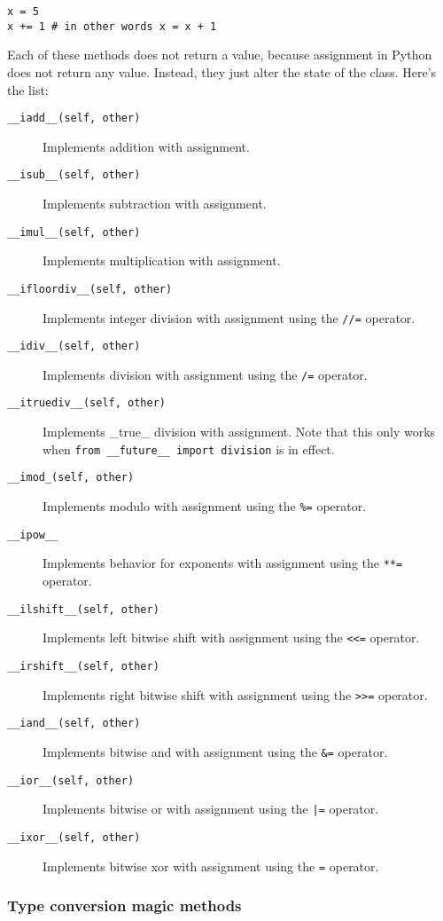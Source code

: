\documentclass[a4paper,11pt]{article}
\newcommand{\code}[1]{\texttt{#1}}
\begin{document}
\begin{lstlisting}
x = 5
x += 1 # in other words x = x + 1
\end{lstlisting}

Each of these methods does not return a value, because assignment in Python does not return any value. Instead, they just alter the state of the class. Here's the list:

\begin{description}

\item[\code{__iadd__(self, other)}]
Implements addition with assignment.
\item[\code{__isub__(self, other)}]
Implements subtraction with assignment.
\item[\code{__imul__(self, other)}]
Implements multiplication with assignment.
\item[\code{__ifloordiv__(self, other)}]
Implements integer division with assignment using the \code{//=} operator.
\item[\code{__idiv__(self, other)}]
Implements division with assignment using the \code{/=} operator.
\item[\code{__itruediv__(self, other)}]
Implements _true_ division with assignment. Note that this only works when \code{from __future__ import division} is in effect.
\item[\code{__imod_(self, other)}]
Implements modulo with assignment using the \code{\%=} operator.
\item[\code{__ipow__}]
Implements behavior for exponents with assignment using the \code{**=} operator.
\item[\code{__ilshift__(self, other)}]
Implements left bitwise shift with assignment using the \code{<<=} operator.
\item[\code{__irshift__(self, other)}]
Implements right bitwise shift with assignment using the \code{>>=} operator.
\item[\code{__iand__(self, other)}]
Implements bitwise and with assignment using the \code{\&=} operator.
\item[\code{__ior__(self, other)}]
Implements bitwise or with assignment using the \code{|=} operator.
\item[\code{__ixor__(self, other)}]
Implements bitwise xor with assignment using the \code{=} operator.

\end{description}

\subsubsection{Type conversion magic methods}
\end{document}

